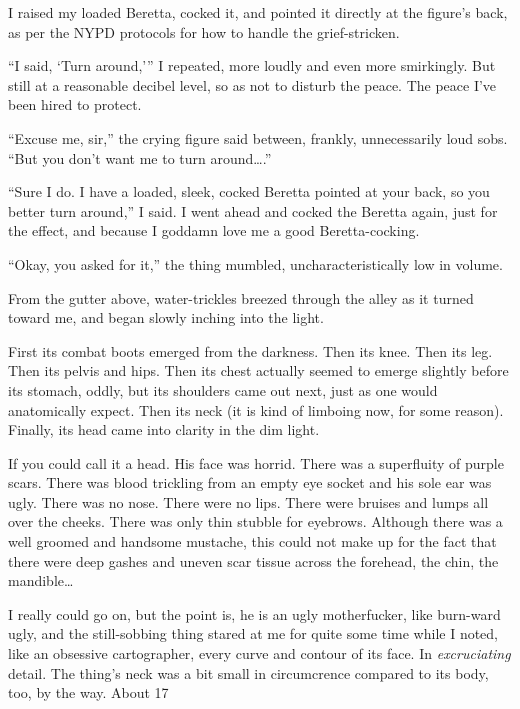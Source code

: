 I raised my loaded Beretta, cocked it, and pointed it directly at
the figure's back, as per the NYPD protocols for how to
handle the grief-stricken.



``I said, `Turn around,''' I repeated, more
loudly and even more smirkingly. But still at a reasonable decibel
level, so as not to disturb the peace. The peace I've been
hired to protect.



``Excuse me, sir,'' the crying figure said between,
frankly, unnecessarily loud sobs. ``But you don't want
me to turn around{\ldots}.''



``Sure I do. I have a loaded, sleek, cocked Beretta pointed at
your back, so you better turn around,'' I said. I went ahead
and cocked the Beretta again, just for the effect, and because I
goddamn love me a good Beretta-cocking.



``Okay, you asked for it,'' the thing mumbled,
uncharacteristically low in volume.



From the gutter above, water-trickles breezed through the alley as
it turned toward me, and began slowly inching into the light.



First its combat boots emerged from the darkness. Then its knee.
Then its leg. Then its pelvis and hips. Then its chest actually
seemed to emerge slightly before its stomach, oddly, but its
shoulders came out next, just as one would anatomically expect.
Then its neck (it is kind of limboing now, for some reason).
Finally, its head came into clarity in the dim light.



If you could call it a head. His face was horrid. There was a
superfluity of purple scars. There was blood trickling from an
empty eye socket and his sole ear was ugly. There was no nose.
There were no lips. There were bruises and lumps all over the
cheeks. There was only thin stubble for eyebrows. Although there
was a well groomed and handsome mustache, this could not make up
for the fact that there were deep gashes and uneven scar tissue
across the forehead, the chin, the mandible{\ldots}



I really could go on, but the point is, he is an ugly motherfucker,
like burn-ward ugly, and the still-sobbing thing stared at me for
quite some time while I noted, like an obsessive cartographer,
every curve and contour of its face. In {\em excruciating} detail.
The thing's neck was a bit small in circumcrence compared to
its body, too, by the way. About 17%



